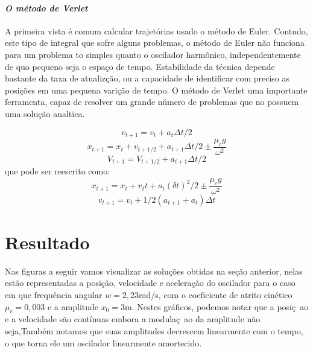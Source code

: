 \documentclass[a4paper]{article} %
\begin{document}
\paragraph{\textit{O m\'etodo de Verlet}} A primeira vista \'e comum calcular trajet\'orias usado o m\'etodo de Euler. Contudo, este tipo de integral que sofre alguns problemas, o  m\'etodo de Euler n\~ao funciona para um problema to simples quanto o oscilador harm\^onico, independentemente de quo pequeno seja o espa\c{c}o de tempo. Estabilidade da t\'ecnica depende bastante da taxa de atualiz\c{c}\~ao, ou a capacidade de identificar com preciso as posi\c{c}\~oes em uma pequena vari\c{c}\~ao de tempo. O m\'etodo de Verlet uma importante ferramenta, capaz de resolver um grande n\'umero de problemas que no possuem uma solu\c{c}\~ao analtica.

\[v_{t+1} = v_t + a_t\Delta{t}/2\]
\[x_{t+1} = x_t + v_{t+1/2} + a_{t+1}\Delta{t}/2 \pm \frac{\mu_cg}{\omega^2}\]
\[V_{t+1} = V_{t+1/2} + a_{t+1}\Delta{t}/2 \]
que pode ser reescrito como:
\[x_{t+1} = x_t + v_tt+a_t(\delta{t})^2/2 \pm \frac{\mu_cg}{\omega^2}\]
\[v_{t+1} = v_t + 1/2(a_{t+1}+a_t)\Delta{t}\]

\section{Resultado}

Nas figuras a seguir vamos visualizar as solu\c{c}\~oes obtidas na se\c{c}\~ao anterior, nelas est\~ao representadas a posi\c{c}\~ao, velocidade e acelera\c{c}\~ao do oscilador para o caso em que frequ\^encia angular $w = 2,23$rad/s, com o coeficiente de atrito cin\'etico $\mu_c = 0,003$ e a amplitude $x_0 = 3$m. Nestes
gr\'aficos, podemos notar que a posi\c{c}~ao e a velocidade s\~ao cont\'inuas embora a modula\c{c}~ao da amplitude n\~ao seja,Tamb\'em notamos que suas amplitudes decrescem linearmente com o tempo, o que torna ele um oscilador linearmente amortecido.
\end{document}
